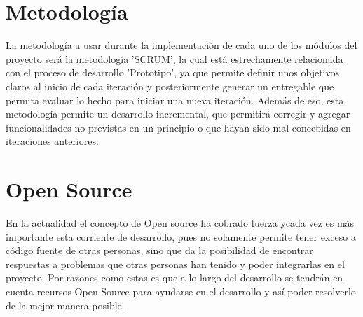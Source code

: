 \section{Metodología}
La metodología a usar durante la implementación de cada uno de los módulos del proyecto será la metodología 'SCRUM', la cual está estrechamente relacionada con el proceso de desarrollo 'Prototipo', ya que permite definir unos objetivos claros al inicio de cada iteración y posteriormente generar un entregable que permita evaluar lo hecho para iniciar una nueva iteración. Además de eso, esta metodología permite un desarrollo incremental, que permitirá corregir y agregar funcionalidades no previstas en un principio o que hayan sido mal concebidas en iteraciones anteriores.

\section{Open Source}
En la actualidad el concepto de Open source ha cobrado fuerza ycada vez
es más importante esta corriente de desarrollo, pues no solamente permite
tener exceso a código fuente de otras personas, sino que da la posibilidad
de encontrar respuestas a problemas que otras personas han tenido y poder
integrarlas en el proyecto. Por razones como estas es que a lo largo del
desarrollo se tendrán en cuenta recursos Open Source para ayudarse en el
desarrollo y así poder resolverlo de la mejor manera posible.